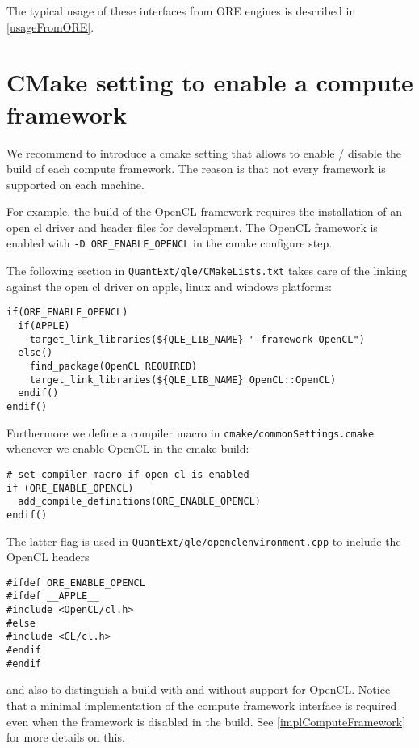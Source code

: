 \documentclass[12pt, a4paper]{article}
\begin{document}
The typical usage of these interfaces from ORE engines is described in \ref{usageFromORE}.

\section{CMake setting to enable a compute framework}\label{cmakeSetting}

We recommend to introduce a cmake setting that allows to enable / disable the build of each compute framework. The
reason is that not every framework is supported on each machine.

For example, the build of the OpenCL framework requires the installation of an open cl driver and header files for
development. The OpenCL framework is enabled with \verb+-D ORE_ENABLE_OPENCL+ in the cmake configure step.

The following section in \verb+QuantExt/qle/CMakeLists.txt+ takes care of the linking against the open cl driver on
apple, linux and windows platforms:

\begin{verbatim}
if(ORE_ENABLE_OPENCL)
  if(APPLE)
    target_link_libraries(${QLE_LIB_NAME} "-framework OpenCL")
  else()
    find_package(OpenCL REQUIRED)
    target_link_libraries(${QLE_LIB_NAME} OpenCL::OpenCL)
  endif()
endif()
\end{verbatim}

Furthermore we define a compiler macro in \verb+cmake/commonSettings.cmake+ whenever we enable OpenCL in the cmake
build:

\begin{verbatim}
# set compiler macro if open cl is enabled
if (ORE_ENABLE_OPENCL)
  add_compile_definitions(ORE_ENABLE_OPENCL)
endif()
\end{verbatim}

The latter flag is used in \verb+QuantExt/qle/openclenvironment.cpp+ to include the OpenCL headers

\begin{verbatim}
#ifdef ORE_ENABLE_OPENCL
#ifdef __APPLE__
#include <OpenCL/cl.h>
#else
#include <CL/cl.h>
#endif
#endif
\end{verbatim}

and also to distinguish a build with and without support for OpenCL. Notice that a minimal implementation of the compute
framework interface is required even when the framework is disabled in the build. See \ref{implComputeFramework} for more
details on this.
\end{document}
